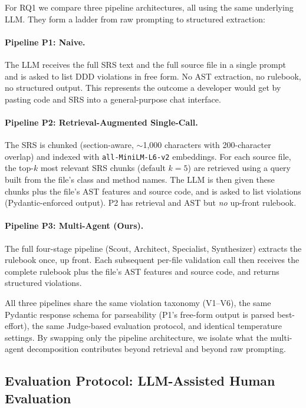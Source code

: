 \documentclass[smallextended]{svjour3}
\begin{document}
For RQ1 we compare three pipeline architectures, all using the same underlying LLM.
They form a ladder from raw prompting to structured extraction:

\paragraph{Pipeline P1: Naive.}
The LLM receives the full SRS text and the full source file in a single prompt and is asked to list DDD violations in free form.
No AST extraction, no rulebook, no structured output.
This represents the outcome a developer would get by pasting code and SRS into a general-purpose chat interface.

\paragraph{Pipeline P2: Retrieval-Augmented Single-Call.}
The SRS is chunked (section-aware, $\sim$1{,}000 characters with 200-character overlap) and indexed with \texttt{all-MiniLM-L6-v2} embeddings.
For each source file, the top-$k$ most relevant SRS chunks (default $k{=}5$) are retrieved using a query built from the file's class and method names.
The LLM is then given these chunks plus the file's AST features and source code, and is asked to list violations (Pydantic-enforced output).
P2 has retrieval and AST but \emph{no} up-front rulebook.

\paragraph{Pipeline P3: Multi-Agent (Ours).}
The full four-stage pipeline (Scout, Architect, Specialist, Synthesizer) extracts the rulebook once, up front.
Each subsequent per-file validation call then receives the complete rulebook plus the file's AST features and source code, and returns structured violations.

All three pipelines share the same violation taxonomy (V1--V6), the same Pydantic response schema for parseability (P1's free-form output is parsed best-effort), the same Judge-based evaluation protocol, and identical temperature settings.
By swapping only the pipeline architecture, we isolate what the multi-agent decomposition contributes beyond retrieval and beyond raw prompting.

\subsection{Evaluation Protocol: LLM-Assisted Human Evaluation}
\label{sec:exp_ground_truth}
\end{document}
